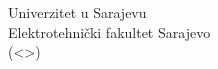 \begin{center}
	\LARGE
	Univerzitet u Sarajevu \\
	Elektrotehnički fakultet Sarajevo \\
	(<>)
\end{center}
